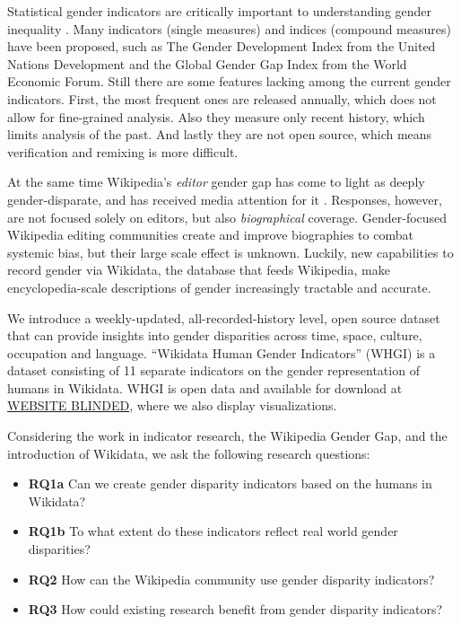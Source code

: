 \documentclass{sig-alternate-05-2015}
\begin{document}
Statistical gender indicators are critically important to understanding gender inequality \cite{klasen_gender-related_2004}. Many indicators (single measures) and indices (compound measures) have been proposed, such as The Gender Development Index from the United Nations Development and the Global Gender Gap Index from the World Economic Forum. Still there are some features lacking among the current gender indicators. First, the most frequent ones are released annually, which does not allow for fine-grained analysis. Also they measure only recent history, which limits analysis of the past. And lastly they are not open source, which means verification and remixing is more difficult.


At the same time Wikipedia's \textit{editor} gender gap has come to light as deeply gender-disparate, and has received media attention for it \cite{cohen_wikipedia_2011}. Responses, however, are not focused solely on editors, but also \textit{biographical} coverage. Gender-focused Wikipedia editing communities create and improve biographies to combat systemic bias, but their large scale effect is unknown. Luckily, new capabilities to record gender via Wikidata, the database that feeds Wikipedia, make encyclopedia-scale descriptions of gender increasingly tractable and accurate.

We introduce a weekly-updated, all-recorded-history level, open source dataset that can provide insights into gender disparities across time, space, culture, occupation and language. ``Wikidata Human Gender Indicators'' (WHGI) is a dataset consisting  of 11 separate indicators on the gender representation of humans in Wikidata. WHGI is open data and available for download at \url{WEBSITE BLINDED}, where we also display visualizations. 

Considering the work in indicator research, the Wikipedia Gender Gap, and the introduction of Wikidata, we ask the following research questions:
\begin{itemize}
\item\textbf{RQ1a} Can we create gender disparity indicators based on the humans in Wikidata?
\item\textbf{RQ1b} To what extent do these indicators reflect real world gender disparities?
\item\textbf{RQ2} How can the Wikipedia community use gender disparity indicators?
\item\textbf{RQ3} How could existing research benefit from gender disparity indicators?
\end{itemize}
\end{document}
